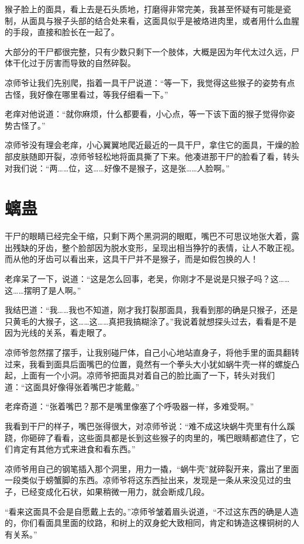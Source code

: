 猴子脸上的面具，看上去是石头质地，打磨得非常完美，我甚至怀疑有可能是瓷制，从面具与猴子头部的结合处来看，这面具似乎是被烙进肉里，或者用什么血腥的手段，直接和脸长在一起了。

大部分的干尸都很完整，只有少数只剩下一个肢体，大概是因为年代太过久远，尸体干化过于厉害而导致的自然碎裂。

凉师爷让我们先别爬，指着一具干尸说道：“等一下，我觉得这些猴子的姿势有点古怪，我好像在哪里看过，等我仔细看一下。”

老痒对他说道：“就你麻烦，什么都要看，小心点，等一下该下面的猴子觉得你姿势古怪了。”

凉师爷没有理会老痒，小心翼翼地爬近最近的一具干尸，拿住它的面具，干燥的脸部皮肤随即开裂，凉师爷轻松地将面具撕了下来。他凑进那干尸的脸看了看，转头对我们说：“两……位，这……好像不是猴子，这是张……人脸啊。”

\chapter{螭蛊}

干尸的眼睛已经完全干缩，只剩下两个黑洞洞的眼眶，嘴巴不可思议地张大着，露出残缺的牙齿，整个脸部因为脱水变形，呈现出相当狰狞的表情，让人不敢正视。而从他的牙齿可以看出来，这具干尸并不是猴子，而是如假包换的人！

老痒呆了一下，说道：“这是怎么回事，老吴，你刚才不是说是只猴子吗？这……这……摆明了是人啊。”

我结巴道：“我……我也不知道，刚才我打裂那面具，我看到那的确是只猴子，还是只黄毛的大猴子，这……这……真把我搞糊涂了。”我说着就想探头过去，看看是不是因为光线的关系，看走眼了。

凉师爷忽然摆了摆手，让我别碰尸体，自己小心地站直身子，将他手里的面具翻转过来，我看到面具后面嘴巴的位置，竟然有一个拳头大小犹如蜗牛壳一样的螺旋凸起，上面有一个小洞。凉师爷把面具对着自己的脸比画了一下，转头对我们道：“这面具好像得张着嘴巴才能戴。”

老痒奇道：“张着嘴巴？那不是嘴里像塞了个呼吸器一样，多难受啊。”

我看到干尸的样子，嘴巴张得很大，对凉师爷说：“难不成这块蜗牛壳里有什么蹊跷，你砸碎了看看，这些面具都是长到这些猴子的肉里的，嘴巴眼睛都遮住了，它们肯定有其他方式来进食和看东西。”

凉师爷用自己的钢笔插入那个洞里，用力一撬，“蜗牛壳”就碎裂开来，露出了里面一段类似于螃蟹脚的东西。凉师爷将这东西扯出来，发现是一条从来没见过的虫子，已经变成化石状，如果稍微一用力，就会断成几段。

“看来这面具不会是自愿戴上去的。”凉师爷皱着眉头说道，“不过这东西的确是人造的，你们看面具里面的纹路，和树上的双身蛇大致相同，肯定和铸造这棵铜树的人有关系。”

